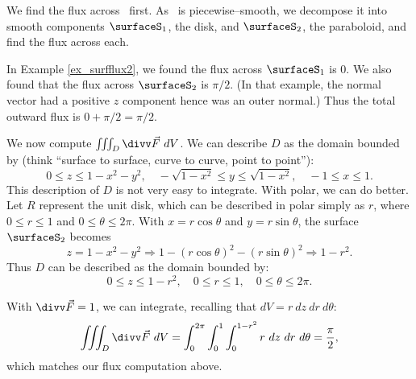 {We find the flux across \surfaceS\ first. As \surfaceS\ is piecewise--smooth, we decompose it into smooth components $\surfaceS_1$, the disk, and $\surfaceS_2$, the paraboloid, and find the flux across each.

In Example \ref{ex_surfflux2}, we found the flux across $\surfaceS_1$ is 0. We also found that the flux across $\surfaceS_2$ is $\pi/2$. (In that example, the normal vector had a positive $z$ component hence was an outer normal.) Thus the total outward flux is $0+\pi/2 = \pi/2$.

We now compute $\iiint_D \divv \vec F\ dV$. We can describe $D$ as the domain bounded by (think ``surface to surface, curve to curve, point to point''):
\[
0\leq z\leq 1-x^2-y^2, \quad -\sqrt{1-x^2}\leq y\leq \sqrt{1-x^2},\quad -1\leq x\leq 1.
\]
This description of $D$ is not very easy to integrate. With polar, we can do better. Let $R$ represent the unit disk, which can be described in polar simply as $r$, where $0\leq r\leq 1$ and $0\leq \theta\leq 2\pi$. With $x=r\cos \theta$ and $y=r\sin\theta$, the surface $\surfaceS_2$ becomes
\[
z=1-x^2-y^2 \Rightarrow 1-(r\cos\theta)^2-(r\sin\theta)^2 \Rightarrow 1-r^2.
\]
Thus $D$ can be described as the domain bounded by:
\[
0\leq z\leq 1-r^2,\quad 0\leq r\leq 1,\quad 0\leq \theta\leq 2\pi.
\]

With $\divv \vec F = 1$, we can integrate, recalling that $dV = r\ dz\ dr\ d\theta$:
\[
\iiint_D\divv \vec F\ dV = \int_0^{2\pi}\int_0^1\int_0^{1-r^2} r\ dz\ dr\ d\theta = \frac{\pi}2,
\]
which matches our flux computation above.
}\pagebreak

